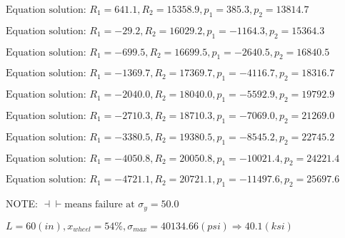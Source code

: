 \documentclass[11pt]{article}
\newcommand{\prompt}[4]{
        {\ttfamily\llap{{\color{#2}[#3]:\hspace{3pt}#4}}\vspace{-\baselineskip}}
    }
\begin{document}
    $\text{Equation solution: } R_1=641.1,R_2=15358.9, p_1=385.3, p_2=13814.7$

    
 
            
\prompt{Out}{outcolor}{12}{}
    
    $\text{Equation solution: } R_1=-29.2,R_2=16029.2, p_1=-1164.3, p_2=15364.3$

    
 
            
\prompt{Out}{outcolor}{12}{}
    
    $\text{Equation solution: } R_1=-699.5,R_2=16699.5, p_1=-2640.5, p_2=16840.5$

    
 
            
\prompt{Out}{outcolor}{12}{}
    
    $\text{Equation solution: } R_1=-1369.7,R_2=17369.7, p_1=-4116.7, p_2=18316.7$

    
 
            
\prompt{Out}{outcolor}{12}{}
    
    $\text{Equation solution: } R_1=-2040.0,R_2=18040.0, p_1=-5592.9, p_2=19792.9$

    
 
            
\prompt{Out}{outcolor}{12}{}
    
    $\text{Equation solution: } R_1=-2710.3,R_2=18710.3, p_1=-7069.0, p_2=21269.0$

    
 
            
\prompt{Out}{outcolor}{12}{}
    
    $\text{Equation solution: } R_1=-3380.5,R_2=19380.5, p_1=-8545.2, p_2=22745.2$

    
 
            
\prompt{Out}{outcolor}{12}{}
    
    $\text{Equation solution: } R_1=-4050.8,R_2=20050.8, p_1=-10021.4, p_2=24221.4$

    
 
            
\prompt{Out}{outcolor}{12}{}
    
    $\text{Equation solution: } R_1=-4721.1,R_2=20721.1, p_1=-11497.6, p_2=25697.6$

    
 
            
\prompt{Out}{outcolor}{12}{}
    
    NOTE: $\dashv \vdash \text{means failure at } \sigma_y=50.0$

    
 
            
\prompt{Out}{outcolor}{12}{}
    
    $L= 60(in), x_{wheel}=54 \%, \sigma_{max}=40134.66(psi) \Rightarrow 40.1(ksi)$
\end{document}
